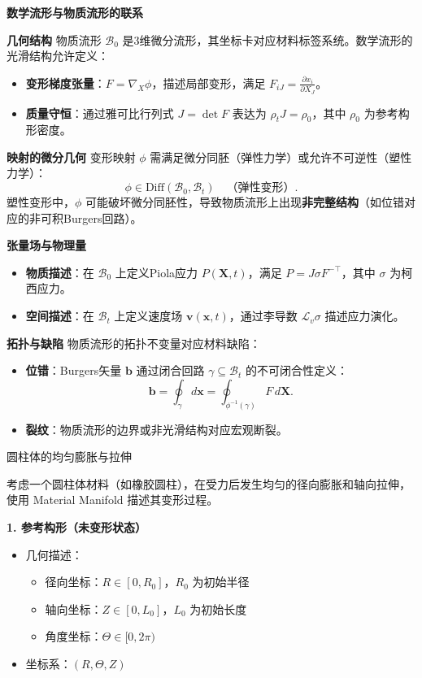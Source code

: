 \documentclass[12pt, a4paper, oneside, UTF8]{ctexbook}  %
\begin{document}
\begin{add}
\begin{center}
    \textbf{数学流形与物质流形的联系}
\end{center}
\textbf{几何结构}
物质流形 \( \mathcal{B}_0 \) 是3维微分流形，其坐标卡对应材料标签系统。数学流形的光滑结构允许定义：
\begin{itemize}
  \item \textbf{变形梯度张量}：\( F = \nabla_X \phi \)，描述局部变形，满足 \( F_{iJ} = \frac{\partial x_i}{\partial X_J} \)。
  \item \textbf{质量守恒}：通过雅可比行列式 \( J = \det F \) 表达为 \( \rho_t J = \rho_0 \)，其中 \( \rho_0 \) 为参考构形密度。
\end{itemize}

\textbf{映射的微分几何}
变形映射 \( \phi \) 需满足微分同胚（弹性力学）或允许不可逆性（塑性力学）：
\begin{equation}
  \phi \in \text{Diff}(\mathcal{B}_0, \mathcal{B}_t) \quad \text{（弹性变形）}.
\end{equation}
塑性变形中，\( \phi \) 可能破坏微分同胚性，导致物质流形上出现\textbf{非完整结构}（如位错对应的非可积Burgers回路）。

\textbf{张量场与物理量}
\begin{itemize}
  \item \textbf{物质描述}：在 \( \mathcal{B}_0 \) 上定义Piola应力 \( P(\mathbf{X}, t) \)，满足 \( P = J \sigma F^{-\top} \)，其中 \( \sigma \) 为柯西应力。
  \item \textbf{空间描述}：在 \( \mathcal{B}_t \) 上定义速度场 \( \mathbf{v}(\mathbf{x}, t) \)，通过李导数 \( \mathcal{L}_v \sigma \) 描述应力演化。
\end{itemize}

\textbf{拓扑与缺陷}
物质流形的拓扑不变量对应材料缺陷：
\begin{itemize}
  \item \textbf{位错}：Burgers矢量 \( \mathbf{b} \) 通过闭合回路 \( \gamma \subseteq \mathcal{B}_t \) 的不可闭合性定义：
  \[
  \mathbf{b} = \oint_\gamma d\mathbf{x} = \oint_{\phi^{-1}(\gamma)} F \, d\mathbf{X}.
  \]
  \item \textbf{裂纹}：物质流形的边界或非光滑结构对应宏观断裂。
\end{itemize}
\begin{example}
圆柱体的均匀膨胀与拉伸

考虑一个圆柱体材料（如橡胶圆柱），在受力后发生均匀的径向膨胀和轴向拉伸，使用 Material Manifold 描述其变形过程。

\textbf{1. 参考构形（未变形状态）}
\begin{itemize}
  \item 几何描述：
    \begin{itemize}
      \item 径向坐标：\( R \in [0, R_0] \)，\( R_0 \) 为初始半径
      \item 轴向坐标：\( Z \in [0, L_0] \)，\( L_0 \) 为初始长度
      \item 角度坐标：\( \Theta \in [0, 2\pi) \)
    \end{itemize}
  \item 坐标系：\( (R, \Theta, Z) \)
\end{itemize}


\end{example}
\end{add}
\end{document}
